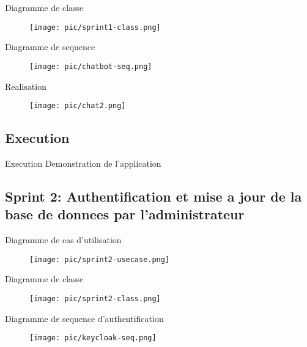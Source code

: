 \documentclass[aspectratio=169]{beamer}
\begin{document}
\begin{frame}{Diagramme de classe}

\begin{figure}[htpb]
        \centering
        \texttt{[image: pic/sprint1-class.png]}
\end{figure}
\end{frame}

\begin{frame}{Diagramme de sequence}
\begin{figure}[htpb]
        \centering
        \texttt{[image: pic/chatbot-seq.png]}
\end{figure}
\end{frame}

\begin{frame}{Realisation}
\begin{figure}[htpb]
        \centering
        \texttt{[image: pic/chat2.png]}
\end{figure}
\end{frame}

\subsection{Execution}
\begin{frame}{Execution}
    Demonstration de l'application
\end{frame}


\subsection{Sprint 2: Authentification et mise a jour de la
base de donnees par l’administrateur}
\begin{frame}{Diagramme de cas d'utilisation}

\begin{figure}[htpb]
        \centering
        \texttt{[image: pic/sprint2-usecase.png]}
\end{figure}
\end{frame}

\begin{frame}{Diagramme de classe}

\begin{figure}[htpb]
        \centering
        \texttt{[image: pic/sprint2-class.png]}
\end{figure}
\end{frame}

\begin{frame}{Diagramme de sequence d'authentification}
\begin{figure}[htpb]
        \centering
        \texttt{[image: pic/keycloak-seq.png]}
\end{figure}
\end{frame}
\end{document}
